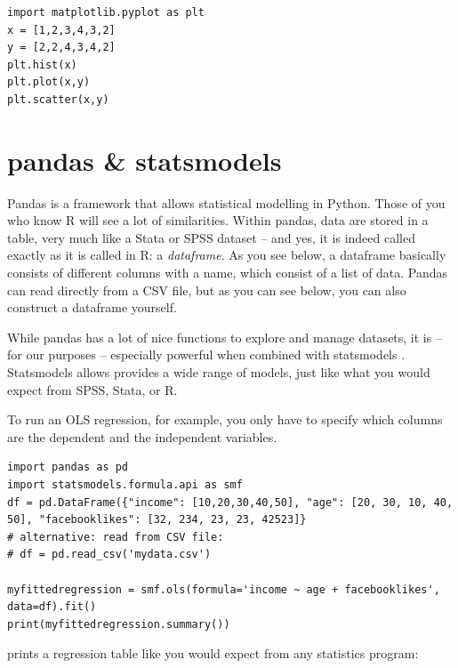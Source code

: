 \documentclass[a4paper,12pt]{book}
\begin{document}
\begin{lstlisting}
import matplotlib.pyplot as plt
x = [1,2,3,4,3,2]
y = [2,2,4,3,4,2]
plt.hist(x)
plt.plot(x,y)
plt.scatter(x,y)
\end{lstlisting}


\section{pandas \& statsmodels}
Pandas \citep{pandas} is a framework that allows statistical modelling in Python. Those of you who know R will see a lot of similarities. Within pandas, data are stored in a table, very much like a Stata or SPSS dataset -- and yes, it is indeed called exactly as it is called in R: a \emph{dataframe}.
As you see below, a dataframe basically consists of different columns with a name, which consist of a list of data. Pandas can read directly from a CSV file, but as you can see below, you can also construct a dataframe yourself. 

While pandas has a lot of nice functions to explore and manage datasets, it is -- for our purposes -- especially powerful when combined with statsmodels \citep{statsmodels}. Statsmodels allows provides a wide range of models, just like what you would expect from SPSS, Stata, or R.

To run an OLS regression, for example, you only have to specify which columns are the dependent and the independent variables. 

\begin{lstlisting}
import pandas as pd
import statsmodels.formula.api as smf
df = pd.DataFrame({"income": [10,20,30,40,50], "age": [20, 30, 10, 40, 50], "facebooklikes": [32, 234, 23, 23, 42523]}
# alternative: read from CSV file:
# df = pd.read_csv('mydata.csv')

myfittedregression = smf.ols(formula='income ~ age + facebooklikes', data=df).fit()
print(myfittedregression.summary())

\end{lstlisting}
prints a regression table like you would expect from any statistics program:
\end{document}

